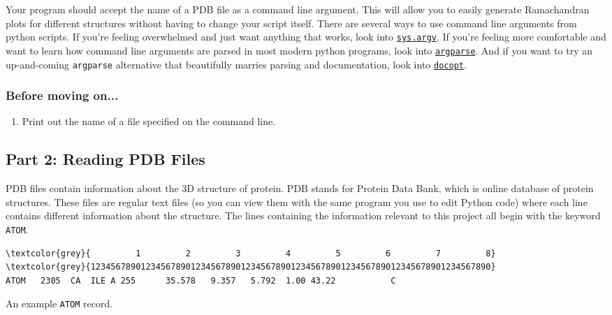 \documentclass{article}
\newcommand{\module}[2]{\href{#2}{\texttt{#1}}}
\newcommand{\atomrec}{\texttt{ATOM} record}
\newenvironment{problems}
{\subsubsection{Before moving on...} \begin{enumerate}}
{\end{enumerate}}
\begin{document}
Your program should accept the name of a PDB file as a command line argument.  
This will allow you to easily generate Ramachandran plots for different 
structures without having to change your script itself.  There are several ways 
to use command line arguments from python scripts.  If you're feeling 
overwhelmed and just want anything that works, look into 
\module{sys.argv}{http://learnpythonthehardway.org/book/ex13.html}.  If you're 
feeling more comfortable and want to learn how command line arguments are 
parsed in most modern python programs, look into 
\module{argparse}{https://docs.python.org/2.7/howto/argparse.html}.  And if you 
want to try an up-and-coming \texttt{argparse} alternative that beautifully 
marries parsing and documentation, look into 
\module{docopt}{https://github.com/docopt/docopt}.

\begin{problems}
\item Print out the name of a file specified on the command line.
\end{problems}

\subsection{Part 2: Reading PDB Files}

PDB files contain information about the 3D structure of protein.  PDB stands 
for Protein Data Bank, which is online database of protein structures.  These  
files are regular text files (so you can view them with the same program you 
use to edit Python code) where each line contains different information about 
the structure.  The lines containing the information relevant to this project 
all begin with the keyword \texttt{ATOM}.  

\begin{listing}[h]
\centering
\begin{BVerbatim}[fontsize=\footnotesize,commandchars=\\\{\}]
\textcolor{grey}{         1         2         3         4         5         6         7         8}
\textcolor{grey}{12345678901234567890123456789012345678901234567890123456789012345678901234567890}
ATOM   2305  CA  ILE A 255      35.578   9.357   5.792  1.00 43.22           C  
\end{BVerbatim}
\caption{An example \atomrec{}.}
\label{list:pdb-example}
\end{listing}
\end{document}
